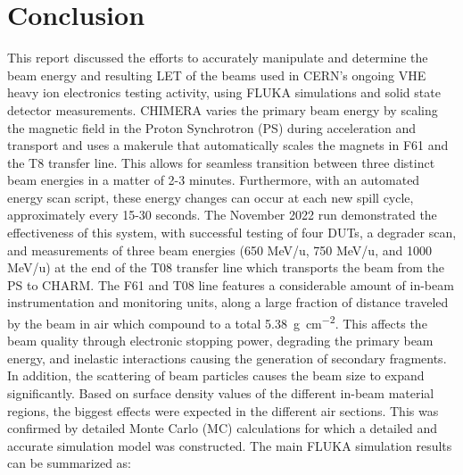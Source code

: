 \documentclass{cernatsnote}
\begin{document}
\section{Conclusion}
This report discussed the efforts to accurately manipulate and determine the beam energy and resulting LET of the beams used in CERN’s ongoing VHE heavy ion electronics testing activity, using FLUKA
simulations and solid state detector measurements. CHIMERA varies the primary beam energy by scaling the magnetic field in the Proton Synchrotron (PS) during acceleration and transport and uses a makerule that automatically scales the magnets in F61 and the T8 transfer line. This allows for seamless transition between three distinct beam energies in a matter of 2-3 minutes. Furthermore, with an automated energy scan script, these energy changes can occur at each new spill cycle, approximately every 15-30 seconds. The November 2022 run demonstrated the effectiveness of this system, with successful testing of four DUTs, a degrader scan, and measurements of three beam energies (650 MeV/u, 750 MeV/u, and 1000 MeV/u) at the end of the T08 transfer line which transports the beam from the PS to CHARM. The F61 and T08 line features a considerable amount of in-beam instrumentation and monitoring units, along a large fraction of distance traveled by the beam in air which compound to a total \SI{5.38}{\gram\per\centi\meter\squared}. This affects the beam quality through electronic stopping power, degrading the primary beam energy, and inelastic interactions causing the generation of secondary fragments. In addition, the scattering of beam particles causes the beam size to expand significantly. Based on surface density values of the different in-beam material regions, the biggest effects were expected in the different air sections. This was confirmed by detailed Monte Carlo (MC) calculations for which a detailed and accurate simulation model was constructed. The main FLUKA simulation results can be summarized as:
\end{document}

